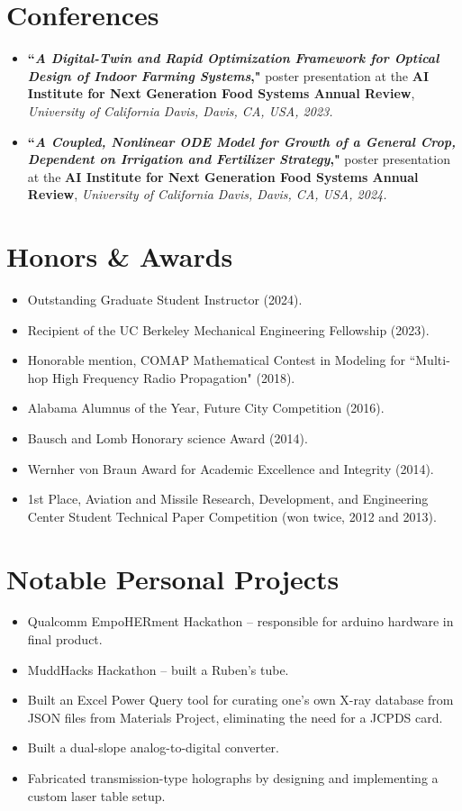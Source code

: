 \documentclass[letterpaper,10.8pt]{article}
\newcommand{\resumeItemNoTitle}[2]{\item\small{\textbf{#1}{ #2 \vspace{-2pt}}}}
\newcommand{\resumeSubHeadingListStart}{\begin{itemize}[leftmargin=*]}
\newcommand{\resumeSubHeadingListEnd}{\end{itemize}}
\begin{document}
\section{Conferences}
\resumeSubHeadingListStart  
\resumeItemNoTitle{``\textit{A Digital-Twin and Rapid Optimization Framework for Optical Design of Indoor Farming Systems}," }{poster presentation at the \textbf{AI Institute for Next Generation Food Systems Annual Review}, \textit{University of California Davis, Davis, CA, USA, 2023.}}
\resumeItemNoTitle{``\textit{A Coupled, Nonlinear ODE Model for Growth of a General Crop, Dependent on Irrigation and Fertilizer Strategy}," }{poster presentation at the \textbf{AI Institute for Next Generation Food Systems Annual Review}, \textit{University of California Davis, Davis, CA, USA, 2024.}}
\resumeSubHeadingListEnd

\section{Honors \& Awards}
\resumeSubHeadingListStart
\resumeItemNoTitle{}{Outstanding Graduate Student Instructor (2024).} 
\resumeItemNoTitle{}{Recipient of the UC Berkeley Mechanical Engineering Fellowship (2023).}
\resumeItemNoTitle{}{Honorable mention, COMAP Mathematical Contest in Modeling for ``Multi-hop High Frequency Radio Propagation" (2018).}
\resumeItemNoTitle{}{Alabama Alumnus of the Year, Future City Competition (2016).}
\resumeItemNoTitle{}{Bausch and Lomb Honorary science Award (2014).}
\resumeItemNoTitle{}{Wernher von Braun Award for Academic Excellence and Integrity (2014).}
\resumeItemNoTitle{}{1st Place, Aviation and Missile Research, Development, and Engineering Center Student Technical Paper Competition (won twice, 2012 and 2013).}
\resumeSubHeadingListEnd

\section{Notable Personal Projects}
\resumeSubHeadingListStart  
\resumeItemNoTitle{}{Qualcomm EmpoHERment Hackathon -- responsible for arduino hardware in final product.}
\resumeItemNoTitle{}{MuddHacks Hackathon -- built a Ruben's tube.}
\resumeItemNoTitle{}{Built an Excel Power Query tool for curating one's own X-ray database from JSON files from Materials Project, eliminating the need for a JCPDS card.}
\resumeItemNoTitle{}{Built a dual-slope analog-to-digital converter.}
\resumeItemNoTitle{}{Fabricated transmission-type holographs by designing and implementing a custom laser table setup.}
\resumeSubHeadingListEnd
 
\end{document}
